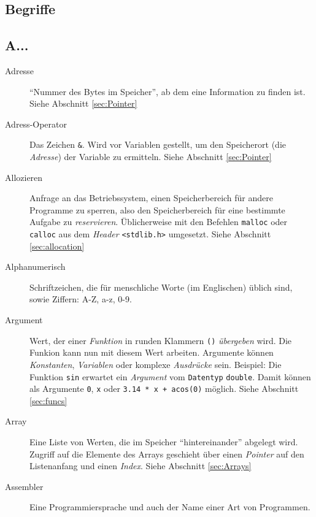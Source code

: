 \appendix
\begin{appendices}
\chapter{Begriffe}
\section*{A...}
\begin{description}
\item[Adresse] \enquote{Nummer des Bytes im Speicher}, ab dem eine Information zu finden ist.\newline
	Siehe Abschnitt \ref{sec:Pointer}
\item[Adress-Operator] Das Zeichen \texttt{\&}. Wird vor Variablen gestellt, um den Speicherort (\ie die 
	\emph{Adresse}) der Variable zu ermitteln.\newline
	Siehe Abschnitt \ref{sec:Pointer}
\item[Allozieren] Anfrage an das Betriebssystem, einen Speicherbereich für andere Programme zu sperren,
	also den Speicherbereich für eine bestimmte Aufgabe zu \emph{reservieren}. Üblicherweise mit den 
	Befehlen \texttt{malloc} oder \texttt{calloc} aus dem \emph{Header} \texttt{<stdlib.h>} umgesetzt.
	\newline
	Siehe Abschnitt \ref{sec:allocation}
\item[Alphanumerisch] Schriftzeichen, die für menschliche Worte (im Englischen) üblich sind, sowie
	Ziffern: A-Z, a-z, 0-9.
\item[Argument] Wert, der einer \emph{Funktion} in runden Klammern \texttt{()} \emph{übergeben} wird.
	Die Funkion kann nun mit diesem Wert arbeiten. Argumente können \emph{Konstanten}, \emph{Variablen}
	oder komplexe \emph{Ausdrücke} sein.\newline
	Beispiel: Die Funktion \texttt{sin} erwartet ein \emph{Argument} vom \texttt{Datentyp} 
	\texttt{double}. Damit können als Argumente \eg \texttt{0}, \texttt{x} oder 
	\texttt{3.14 * x + acos(0)} möglich.\newline
	Siehe Abschnitt \ref{sec:funcs}
\item[Array] Eine Liste von Werten, die im Speicher \enquote{hintereinander} abgelegt wird. Zugriff auf
	die Elemente des Arrays geschieht über einen \emph{Pointer} auf den Listenanfang und einen
	\emph{Index}.\newline
	Siehe Abschnitt \ref{sec:Arrays}
\item[Assembler] Eine Programmiersprache und auch der Name einer Art von Programmen.\newline

\end{description}
\end{appendices}
